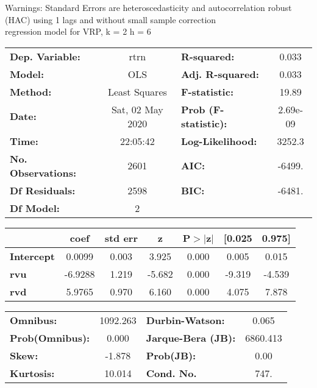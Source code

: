 Warnings: \newline
 [1] Standard Errors are heteroscedasticity and autocorrelation robust (HAC) using 1 lags and without small sample correction\\ 

regression model for VRP, k = 2 h = 6\begin{center}
\begin{tabular}{lclc}
\toprule
\textbf{Dep. Variable:}    &       rtrn       & \textbf{  R-squared:         } &     0.033   \\
\textbf{Model:}            &       OLS        & \textbf{  Adj. R-squared:    } &     0.033   \\
\textbf{Method:}           &  Least Squares   & \textbf{  F-statistic:       } &     19.89   \\
\textbf{Date:}             & Sat, 02 May 2020 & \textbf{  Prob (F-statistic):} &  2.69e-09   \\
\textbf{Time:}             &     22:05:42     & \textbf{  Log-Likelihood:    } &    3252.3   \\
\textbf{No. Observations:} &        2601      & \textbf{  AIC:               } &    -6499.   \\
\textbf{Df Residuals:}     &        2598      & \textbf{  BIC:               } &    -6481.   \\
\textbf{Df Model:}         &           2      & \textbf{                     } &             \\
\bottomrule
\end{tabular}
\begin{tabular}{lcccccc}
                   & \textbf{coef} & \textbf{std err} & \textbf{z} & \textbf{P$> |$z$|$} & \textbf{[0.025} & \textbf{0.975]}  \\
\midrule
\textbf{Intercept} &       0.0099  &        0.003     &     3.925  &         0.000        &        0.005    &        0.015     \\
\textbf{rvu}       &      -6.9288  &        1.219     &    -5.682  &         0.000        &       -9.319    &       -4.539     \\
\textbf{rvd}       &       5.9765  &        0.970     &     6.160  &         0.000        &        4.075    &        7.878     \\
\bottomrule
\end{tabular}
\begin{tabular}{lclc}
\textbf{Omnibus:}       & 1092.263 & \textbf{  Durbin-Watson:     } &    0.065  \\
\textbf{Prob(Omnibus):} &   0.000  & \textbf{  Jarque-Bera (JB):  } & 6860.413  \\
\textbf{Skew:}          &  -1.878  & \textbf{  Prob(JB):          } &     0.00  \\
\textbf{Kurtosis:}      &  10.014  & \textbf{  Cond. No.          } &     747.  \\
\bottomrule
\end{tabular}
\end{center}

